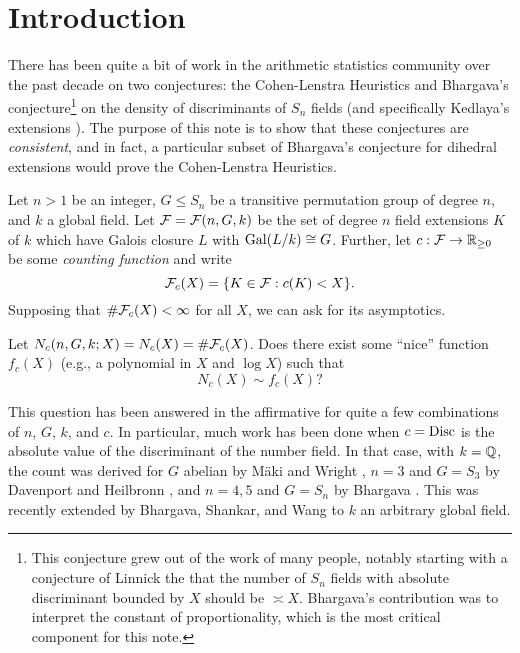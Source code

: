 \section{Introduction}\label{sec:introduction}

There has been quite a bit of work in the arithmetic statistics community over
the past decade on two conjectures: the Cohen-Lenstra Heuristics
\cite{CohenLenstra} and Bhargava's conjecture\footnote{This conjecture grew out of
the work of many people, notably starting with a conjecture of Linnick
\cite{Linnick} the that the number of $S_n$ fields with absolute discriminant
bounded by $X$ should be $\asymp X$. Bhargava's contribution was to interpret
the constant of proportionality, which is the most critical component for this
note.} on the density of discriminants of $S_n$ fields \cite{bhargavamass} (and
specifically Kedlaya's extensions \cite{kedlayamass}). The purpose of this note
is to show that these conjectures are {\em consistent}, and in fact, a particular
subset of Bhargava's conjecture for dihedral extensions would prove the Cohen-Lenstra
Heuristics.

Let $n > 1$ be an integer, $G \leq S_n$ be a transitive permutation group of
degree $n$, and $k$ a global field. Let $\mathcal{F} = \mathcal{F}(n, G, k)$ be the set of
degree $n$ field extensions $K$ of $k$ which have Galois closure $L$ with
$\operatorname{Gal}(L/k) \cong G$. Further, let $c: \mathcal{F} \to \mathbb{R}_{\geq 0}$ be some {\em
counting function} and write \[ \mathcal{F}_c(X) = \{ K \in \mathcal{F} : c(K) < X \}. \]
Supposing that $\# \mathcal{F}_c(X) < \infty$ for all $X$, we can ask for its
asymptotics.

\begin{question}
  Let $N_c(n, G, k; X) = N_c(X) = \# \mathcal{F}_c(X)$. Does there exist some ``nice''
  function $f_c(X)$ (e.g., a polynomial in $X$ and $\log X$) such that \[ N_c(X) \sim f_c(X)? \]
\end{question}

This question has been answered in the affirmative for quite a few combinations
of $n$, $G$, $k$, and $c$. In particular, much work has been done when $c =
\operatorname{Disc}$ is the absolute value of the discriminant of the number field. In that
case, with $k = \mathbb{Q}$, the count was derived for $G$ abelian by M\"aki
\cite{Maki} and Wright \cite{WrightAbelian}, $n = 3$ and $G = S_3$ by
Davenport and Heilbronn \cite{DavenportHeilbronn}, and $n = 4, 5$ and $G = S_n$
by Bhargava \cite{BhargavaQuarticCount, BhargavaQuinticCount}. This was
recently extended by Bhargava, Shankar, and Wang \cite{BhargavaShankarWang} to
$k$ an arbitrary global field.

